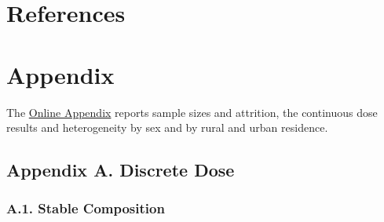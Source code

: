 \clearpage
\section*{References}
\begingroup
\singlespacing
\small
\nocite{*}
\printbibliography[heading=none]
\endgroup

\clearpage
\section*{Appendix}
\setcounter{table}{0}
\setcounter{figure}{0}
\setcounter{equation}{0}
\renewcommand{\thetable}{A\arabic{table}}
\renewcommand{\thefigure}{A\arabic{figure}}
\renewcommand{\theequation}{A\arabic{equation}}

The \href{Online_Appendix.pdf}{Online Appendix} reports sample sizes and attrition, the continuous dose results and heterogeneity by sex and by rural and urban residence.

\subsection*{Appendix A. Discrete Dose}\label{app:discrete}

\subsubsection*{A.1. Stable Composition}\label{app:composition}




